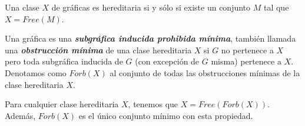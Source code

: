 Una clase $X$ de gráficas es hereditaria si y sólo si existe un conjunto $M$ tal que $X = Free(M)$.

Una gráfica es una \textbf{\emph{subgráfica inducida  prohibida mínima}}, también llamada una \textbf{\emph{obstrucción mínima}} de una clase hereditaria $X$ si $G$ no pertenece a $X$ pero toda subgráfica inducida de $G$ (con excepción de $G$ misma) pertenece a $X$. Denotamos como $Forb(X)$ al conjunto de todas las obstrucciones mínimas de la clase hereditaria $X$.

Para cualquier clase hereditaria $X$, tenemos que $X = Free(Forb(X))$. Además, $Forb(X)$ es el único conjunto mínimo con esta propiedad.
